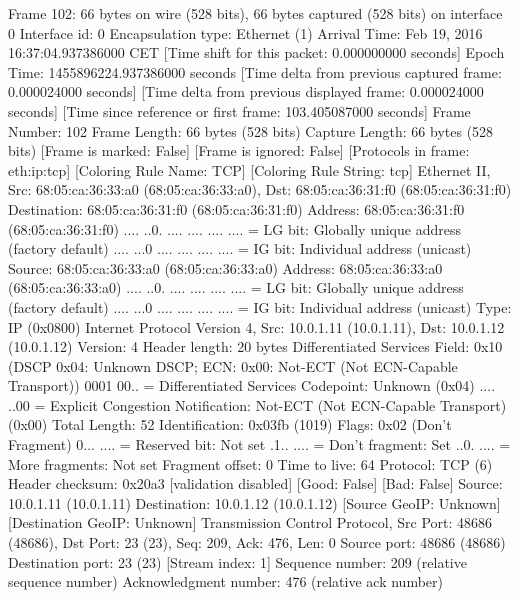 Frame 102: 66 bytes on wire (528 bits), 66 bytes captured (528 bits) on interface 0
    Interface id: 0
    Encapsulation type: Ethernet (1)
    Arrival Time: Feb 19, 2016 16:37:04.937386000 CET
    [Time shift for this packet: 0.000000000 seconds]
    Epoch Time: 1455896224.937386000 seconds
    [Time delta from previous captured frame: 0.000024000 seconds]
    [Time delta from previous displayed frame: 0.000024000 seconds]
    [Time since reference or first frame: 103.405087000 seconds]
    Frame Number: 102
    Frame Length: 66 bytes (528 bits)
    Capture Length: 66 bytes (528 bits)
    [Frame is marked: False]
    [Frame is ignored: False]
    [Protocols in frame: eth:ip:tcp]
    [Coloring Rule Name: TCP]
    [Coloring Rule String: tcp]
Ethernet II, Src: 68:05:ca:36:33:a0 (68:05:ca:36:33:a0), Dst: 68:05:ca:36:31:f0 (68:05:ca:36:31:f0)
    Destination: 68:05:ca:36:31:f0 (68:05:ca:36:31:f0)
        Address: 68:05:ca:36:31:f0 (68:05:ca:36:31:f0)
        .... ..0. .... .... .... .... = LG bit: Globally unique address (factory default)
        .... ...0 .... .... .... .... = IG bit: Individual address (unicast)
    Source: 68:05:ca:36:33:a0 (68:05:ca:36:33:a0)
        Address: 68:05:ca:36:33:a0 (68:05:ca:36:33:a0)
        .... ..0. .... .... .... .... = LG bit: Globally unique address (factory default)
        .... ...0 .... .... .... .... = IG bit: Individual address (unicast)
    Type: IP (0x0800)
Internet Protocol Version 4, Src: 10.0.1.11 (10.0.1.11), Dst: 10.0.1.12 (10.0.1.12)
    Version: 4
    Header length: 20 bytes
    Differentiated Services Field: 0x10 (DSCP 0x04: Unknown DSCP; ECN: 0x00: Not-ECT (Not ECN-Capable Transport))
        0001 00.. = Differentiated Services Codepoint: Unknown (0x04)
        .... ..00 = Explicit Congestion Notification: Not-ECT (Not ECN-Capable Transport) (0x00)
    Total Length: 52
    Identification: 0x03fb (1019)
    Flags: 0x02 (Don't Fragment)
        0... .... = Reserved bit: Not set
        .1.. .... = Don't fragment: Set
        ..0. .... = More fragments: Not set
    Fragment offset: 0
    Time to live: 64
    Protocol: TCP (6)
    Header checksum: 0x20a3 [validation disabled]
        [Good: False]
        [Bad: False]
    Source: 10.0.1.11 (10.0.1.11)
    Destination: 10.0.1.12 (10.0.1.12)
    [Source GeoIP: Unknown]
    [Destination GeoIP: Unknown]
Transmission Control Protocol, Src Port: 48686 (48686), Dst Port: 23 (23), Seq: 209, Ack: 476, Len: 0
    Source port: 48686 (48686)
    Destination port: 23 (23)
    [Stream index: 1]
    Sequence number: 209    (relative sequence number)
    Acknowledgment number: 476    (relative ack number)
